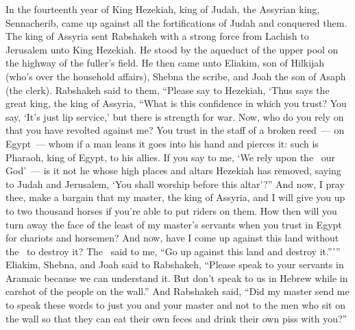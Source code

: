 
\begin{inparaenum}
   In the fourteenth year of King Hezekiah, king of Judah, the Assyrian king, Sennacherib, came up against all the fortifications of Judah and conquered them.%
   The king of Assyria sent Rabshakeh with a strong force from Lachish to Jerusalem unto King Hezekiah. He stood by the aqueduct of the upper pool on the highway of the fuller's field.%
   He then came unto Eliakim, son of Hilkijah (who's over the household affairs), Shebna the scribe, and Joah the son of Asaph (the clerk).%
   Rabshakeh said to them, ``Please say to Hezekiah, `Thus says the great king, the king of Assyria, ``What is this confidence in which you trust?%
   You say, `It's just lip service,' but there is strength for war. Now, who do you rely on that you have revolted against me?%
   You trust in the staff of a broken reed~--- on Egypt~--- whom if a man leans it goes into his hand and pierces it: such is Pharaoh, king of Egypt, to his allies.%
   If you say to me, `We rely upon the \lord\ our God'~--- is it not he whose high places and altars Hezekiah has removed, saying to Judah and Jerusalem, `You shall worship before this altar'?''%
   And now, I pray thee, make a bargain that my master, the king of Assyria, and I will give you up to two thousand horses if you're able to put riders on them.%
   How then will you turn away the face of the least of my master's servants when you trust in Egypt for chariots and horsemen?%
   And now, have I come up against this land without the \lord\ to destroy it? The \lord\ said to me, ``Go up against this land and destroy it.''\thinspace'\thinspace''%
   Eliakim, Shebna, and Joah said to Rabshakeh, ``Please speak to your servants in Aramaic because we can understand it. But don't speak to us in Hebrew while in earshot of the people on the wall.''%
   And Rabshakeh said, ``Did my master send me to speak these words to just you and your master and not to the men who sit on the wall so that they can eat their own feces and drink their own piss with you?''%

\end{inparaenum}
